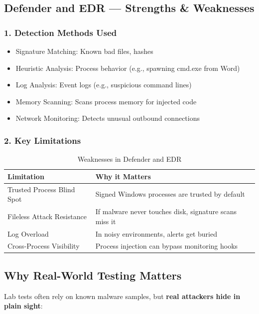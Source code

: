 \subsection{Defender and EDR — Strengths \& Weaknesses}

\subsubsection{1. Detection Methods Used}
\begin{itemize}
    \item Signature Matching: Known bad files, hashes
    \item Heuristic Analysis: Process behavior (e.g., spawning cmd.exe from Word)
    \item Log Analysis: Event logs (e.g., suspicious command lines)
    \item Memory Scanning: Scans process memory for injected code
    \item Network Monitoring: Detects unusual outbound connections
\end{itemize}

\subsubsection{2. Key Limitations}
\begin{table}[H]
    \centering
    \begin{tabular}{|l|l|}
        \hline
        \textbf{Limitation} & \textbf{Why it Matters} \\
        \hline
        Trusted Process Blind Spot & Signed Windows processes are trusted by default \\
        Fileless Attack Resistance & If malware never touches disk, signature scans miss it \\
        Log Overload & In noisy environments, alerts get buried \\
        Cross-Process Visibility & Process injection can bypass monitoring hooks \\
        \hline
    \end{tabular}
    \caption{Weaknesses in Defender and EDR}
\end{table}

\subsection{Why Real-World Testing Matters}

Lab tests often rely on known malware samples, but \textbf{real attackers hide in plain sight}:

